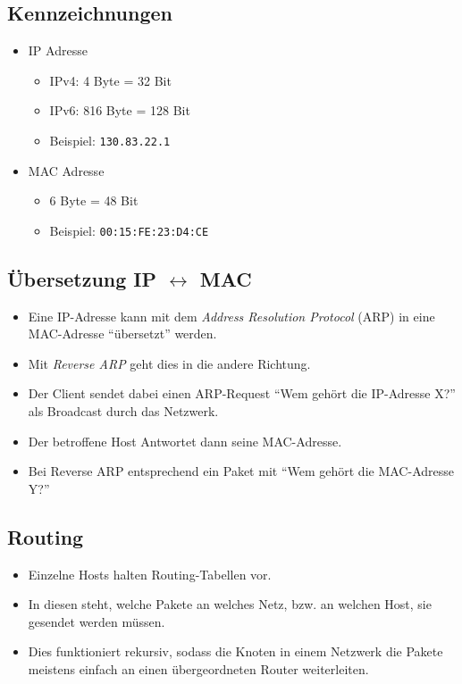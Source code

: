 
        \subsection{Kennzeichnungen}
            \begin{itemize}
            	\item IP Adresse
                	\begin{itemize}
                		\item IPv4: 4 Byte = 32 Bit
                		\item IPv6: 816 Byte = 128 Bit
                		\item Beispiel: \texttt{130.83.22.1}
                	\end{itemize}
            	\item MAC Adresse
                	\begin{itemize}
                		\item 6 Byte = 48 Bit
                		\item Beispiel: \texttt{00:15:FE:23:D4:CE}
                	\end{itemize}
            \end{itemize}

        \subsection{Übersetzung IP \(\leftrightarrow\) MAC}
            \begin{itemize}
            	\item Eine IP-Adresse kann mit dem \textit{Address Resolution Protocol} (ARP) in eine MAC-Adresse \enquote{übersetzt} werden.
            	\item Mit \textit{Reverse ARP} geht dies in die andere Richtung.
            	\item Der Client sendet dabei einen ARP-Request \enquote{Wem gehört die IP-Adresse X?} als Broadcast durch das Netzwerk.
            	\item Der betroffene Host Antwortet dann seine MAC-Adresse.
            	\item Bei Reverse ARP entsprechend ein Paket mit \enquote{Wem gehört die MAC-Adresse Y?}
            \end{itemize}

        \subsection{Routing}
            \begin{itemize}
            	\item Einzelne Hosts halten Routing-Tabellen vor.
            	\item In diesen steht, welche Pakete an welches Netz, bzw. an welchen Host, sie gesendet werden müssen.
            	\item Dies funktioniert rekursiv, sodass die Knoten in einem Netzwerk die Pakete meistens einfach an einen übergeordneten Router weiterleiten.
            \end{itemize}

